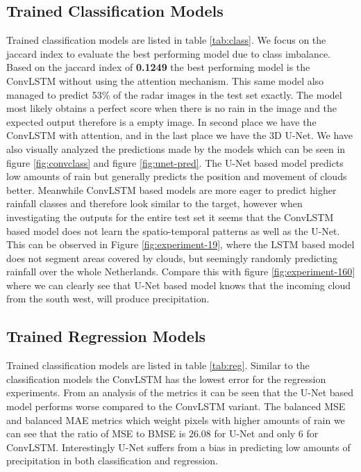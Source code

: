 \subsection{Trained Classification Models}
Trained classification models are listed in table \ref{tab:class}.
We focus on the jaccard index to evaluate the best performing model due to class imbalance.
Based on the jaccard index of \textbf{0.1249} the best performing model is the ConvLSTM without using the attention mechanism. This same model also managed to
predict 53\% of the radar images in the test set exactly. The model most likely obtains a perfect score when there is no rain in the image and the expected output therefore is a empty image.
In second place we have the ConvLSTM with attention, and in the last place we have the 3D U-Net. We have also visually analyzed the predictions made by the models which can be seen in figure \ref{fig:convclass} and figure \ref{fig:unet-pred}.
The U-Net based model predicts low amounts of rain but generally predicts the position and movement of clouds better. Meanwhile ConvLSTM based models are more eager
to predict higher rainfall classes and therefore look similar to the target, however when investigating the outputs for the entire test set it seems that the ConvLSTM based model does not learn the spatio-temporal patterns
as well as the U-Net. This can be observed in Figure \ref{fig:experiment-19}, where the LSTM based model does not segment areas covered by clouds, but seemingly randomly predicting rainfall over the whole Netherlands.
Compare this with figure \ref{fig:experiment-160} where we can clearly see that U-Net based model knows that the incoming cloud from the south west, will produce precipitation.


\subsection{Trained Regression Models}
Trained classification models are listed in table \ref{tab:reg}. Similar to the classification models the ConvLSTM
has the lowest error for the regression experiments. From an analysis of the metrics it can be seen that the U-Net based model performs worse compared to the ConvLSTM variant.
The balanced MSE and balanced MAE metrics which weight pixels with higher amounts of rain we can see that the ratio of MSE to BMSE
is $26.08$ for U-Net and only $6$ for ConvLSTM. Interestingly U-Net suffers from a bias 
in predicting low amounts of precipitation in both classification and regression.




